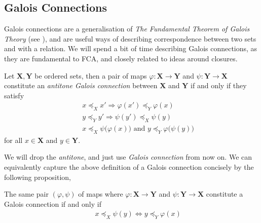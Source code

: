 \subsection{Galois Connections}
\label{subsection:galois-connections}

Galois connections are a generalisation of \textit{The Fundamental Theorem of Galois Theory} (see \cite[pp. 205]{bergman2015invitation}), and are useful ways of describing correspondence between two
sets and with a relation. We will spend a bit of time describing Galois connections, as they are fundamental to FCA, and closely related to ideas around closures.

\begin{definition}
  \label{definition:Galois-connection-1} Let $\mathbf{X}, \mathbf{Y}$ be ordered sets, then a pair of maps $\varphi \colon \mathbf{X}\to \mathbf{Y}$ and $\psi \colon \mathbf{Y}\to \mathbf{X}$
  constitute an \emph{antitone Galois connection} between $\mathbf{X}$ and $\mathbf{Y}$ if and only if they satisfy
  \begin{align}
    \quad & x \preceq_{X}x' \Rightarrow \varphi (x') \preceq_{Y}\varphi (x) \label{equation:ord_galois-1}                             \\
    \quad & y \preceq_{Y}y' \Rightarrow \psi (y') \preceq_{X}\psi (y) \label{equation:ord-galois-2}                                   \\
    \quad & x \preceq_{X}\psi \big(\varphi (x)\big) \text{ and }y \preceq_{Y}\varphi \big(\psi (y)\big) \label{equation:ord-galois-3}
  \end{align}
  for all $x \in \mathbf{X}$ and $y \in \mathbf{Y}$.
\end{definition}

We will drop the \textit{antitone}, and just use \textit{Galois connection} from now on. We can equivalently capture the above definition of a Galois connection concisely by the following proposition,

\begin{proposition}
  \label{proposition:fundamental-galois} The same pair $(\varphi, \psi)$ of maps where $\varphi \colon \mathbf{X}\to \mathbf{Y}$ and $\psi \colon \mathbf{Y}\to \mathbf{X}$ constitute a Galois connection
  if and only if
  \begin{align}
    \quad & x \preceq_{X}\psi (y) \Longleftrightarrow y \preceq_{Y}\varphi (x) \label{equation:ord-galois-4}
  \end{align}
\end{proposition}

